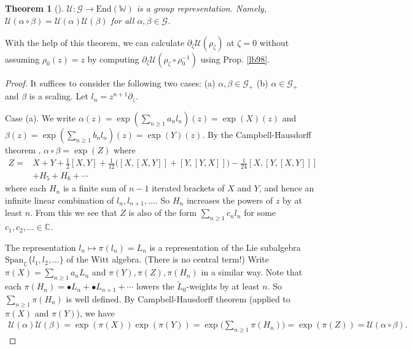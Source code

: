 \documentclass[11pt,b5paper,notitlepage]{article}
\theoremstyle{definition}
\theoremstyle{plain}
\newtheorem{thm}[df]{Theorem}
\newcommand{\mc}{\mathcal}
\newcommand{\wtd}{\widetilde}
\newcommand{\End}{\mathrm{End}} %
\newcommand{\Span}{\mathrm{Span}}
\newcommand{\blt}{\bullet}
\newcommand{\Wbb}{\mathbb W}
\newcommand{\Cbb}{\mathbb C}
\numberwithin{equation}{section}
\begin{document}
\subsection{}



\begin{thm}[{\cite[Sec. 4.2]{Hua97}}]\label{lb100}
$\mc U:\mc G\rightarrow\End(\Wbb)$ is a group representation. Namely, $\mc U(\alpha\circ\beta)=\mc U(\alpha)\mc U(\beta)$ for all $\alpha,\beta\in\mc G$.
\end{thm}

With the help of this theorem, we can calculate $\partial_\zeta\mc U(\rho_\zeta)$ at $\zeta=0$ without assuming $\rho_0(z)=z$ by computing $\partial_\zeta\mc U(\rho_\zeta\circ\rho^{-1}_0)$ using Prop. \ref{lb98}.

\begin{proof}
It suffices to consider the following two cases: (a) $\alpha,\beta\in\mc G_+$ (b) $\alpha\in\mc G_+$ and $\beta$ is a scaling. Let $l_n=z^{n+1}\partial_z$.


Case (a). We write $\alpha(z)=\exp(\sum_{n\geq 1} a_nl_n)(z)=\exp(X)(z)$ and $\beta(z)=\exp(\sum_{n\geq 1} b_nl_n)(z)=\exp(Y)(z)$. By the Campbell-Hausdorff theorem \cite[Sec. V.5]{Jac}, $\alpha\circ\beta=\exp(Z)$ where
\begin{align*}
Z=&X+Y+\frac 12[X,Y]+\frac 1{12}\big([X,[X,Y]]+[Y,[Y,X]]\big)-\frac 1{24}[X,[Y,[X,Y]]]\\
&+H_5+H_6+\cdots
\end{align*}
where each $H_n$ is a finite sum of $n-1$ iterated brackets of $X$ and $Y$, and hence an infinite linear combination of $l_n,l_{n+1},\dots$. So $H_n$ increases the powers of $z$ by at least $n$. From this we see that $Z$ is also of the form $\sum_{n\geq 1}c_nl_n$ for some $c_1,c_2,\dots\in\Cbb$.

The representation $l_n\mapsto \pi(l_n)=L_n$  is a representation of the Lie subalgebra $\Span_\Cbb\{l_1,l_2,\dots\}$ of the Witt algebra. (There is no central term!) Write $\pi(X)=\sum_{n\geq 1}a_nL_n$ and $\pi(Y),\pi(Z),\pi(H_n)$ in a similar way. Note that each $\pi(H_n)=\blt L_n+\blt L_{n+1}+\cdots$ lowers the $\wtd L_0$-weights by at least $n$. So $\sum_{n\geq 1}\pi(H_n)$ is well defined.  By Campbell-Hausdorff theorem (applied to $\pi(X)$ and $\pi(Y)$), we have
\begin{align*}
\mc U(\alpha)\mc U(\beta)=\exp(\pi(X))\exp(\pi(Y))=\exp\Big(\sum_{n\geq 1}\pi(H_n)\Big)	=\exp(\pi(Z))=\mc U(\alpha\circ\beta).
\end{align*}



\end{proof}
\end{document}
